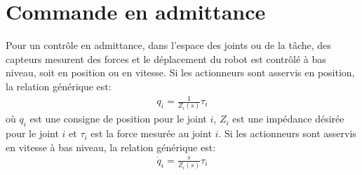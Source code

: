 

\section{Commande en admittance}
\label{sec:admcontrol}

Pour un contrôle en admittance, dans l'espace des joints ou de la tâche, des capteurs mesurent des forces et le déplacement du robot est contrôlé à bas niveau, soit en position ou en vitesse. Si les actionneurs sont asservis en position, la relation générique est:
\begin{align}
	q_i = \frac{1}{Z_i(s)} \tau_i
	\label{eq:admipos}
\end{align}
où $q_i$ est une consigne de position pour le joint $i$, $Z_i$ est une impédance désirée pour le joint $i$ et $\tau_i$ est la force mesurée au joint $i$.
Si les actionneurs sont asservis en vitesse à bas niveau, la relation générique est:
\begin{align}
	\dot{q}_i = \frac{s}{Z_i(s)} \tau_i
	\label{eq:admispeed}
\end{align}

